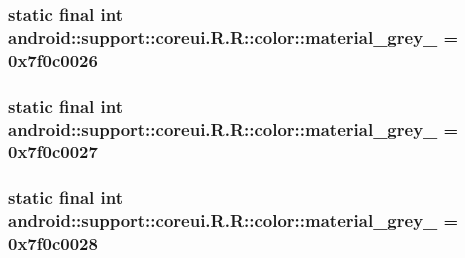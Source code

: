 \hypertarget{classandroid_1_1support_1_1coreui_1_1_r_1_1color_a1984ef54d8b5a0062dfe0621fc08c0c}{
\subsubsection[{material\_\-grey\_\-50}]{\setlength{\rightskip}{0pt plus 5cm}static final int android::support::coreui.R.R::color::material\_\-grey\_ = 0x7f0c0026}}
\label{classandroid_1_1support_1_1coreui_1_1_r_1_1color_a1984ef54d8b5a0062dfe0621fc08c0c}


\hypertarget{classandroid_1_1support_1_1coreui_1_1_r_1_1color_42de27a4bf4c03baf7968199e45f7d29}{
\subsubsection[{material\_\-grey\_\-600}]{\setlength{\rightskip}{0pt plus 5cm}static final int android::support::coreui.R.R::color::material\_\-grey\_ = 0x7f0c0027}}
\label{classandroid_1_1support_1_1coreui_1_1_r_1_1color_42de27a4bf4c03baf7968199e45f7d29}


\hypertarget{classandroid_1_1support_1_1coreui_1_1_r_1_1color_a3e6423c664f0b0f329185ae624452f3}{
\subsubsection[{material\_\-grey\_\-800}]{\setlength{\rightskip}{0pt plus 5cm}static final int android::support::coreui.R.R::color::material\_\-grey\_ = 0x7f0c0028}}
\label{classandroid_1_1support_1_1coreui_1_1_r_1_1color_a3e6423c664f0b0f329185ae624452f3}


